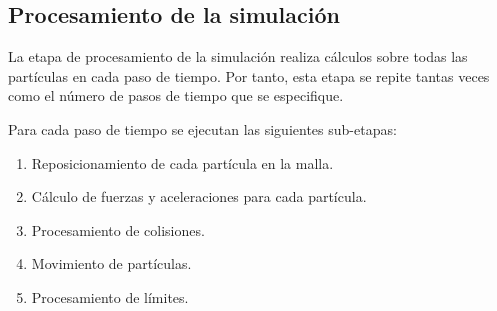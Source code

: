 \subsection{Procesamiento de la simulación}

La etapa de procesamiento de la simulación realiza cálculos sobre todas las
partículas en cada paso de tiempo. Por tanto, esta etapa se repite tantas veces 
como el número de pasos de tiempo que se especifique.

Para cada paso de tiempo se ejecutan las siguientes sub-etapas:

\begin{enumerate}

\item Reposicionamiento de cada partícula en la malla.
\item Cálculo de fuerzas y aceleraciones para cada partícula.
\item Procesamiento de colisiones.
\item Movimiento de partículas.
\item Procesamiento de límites.

\end{enumerate}






